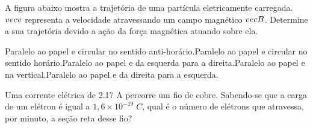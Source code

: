 \documentclass[12pt, addpoints]{exam}
\begin{document}
        \begin{questions}
\begin{multicols*}{2}
\question[20] A ﬁgura abaixo mostra a trajetória de uma partícula eletricamente carregada. $\\vec{{v}}$ representa a velocidade atravessando um campo magnético $\\vec{{B}}$. Determine a sua trajetória devido a ação da força magnética atuando sobre ela.
        
        \begin{center}
            \begin{minipage}[c]{0.5\linewidth}
            \end{minipage}
        \end{center}

        

\begin{choices}
\choice Paralelo ao papel e circular no sentido anti-horário.\choice Paralelo ao papel e circular no sentido horário.\choice Paralelo ao papel e da esquerda para a direita.\choice Paralelo ao papel e na vertical.\choice Paralelo ao papel e da direita para a esquerda.\end{choices}
\question[20] Uma corrente elétrica de    2.17 A percorre um ﬁo de cobre. Sabendo-se que a carga de um elétron é igual a $1,6\times 10^{-19}\;C$, qual é o número de elétrons que atravessa, por minuto, a seção reta desse ﬁo?


\end{multicols*}
\end{questions}
\end{document}
